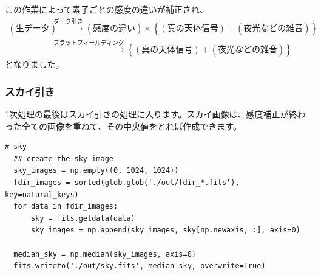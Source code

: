 この作業によって素子ごとの感度の違いが補正され、
\begin{align*}
  (\text{生データ}) &\xrightarrow{\text{ダーク引き}} (感度の違い)\times\left\{ (真の天体信号) + (夜光などの雑音) \right\} \\
  &\xrightarrow{\text{フラットフィールディング}} \left\{ (真の天体信号) + (夜光などの雑音) \right\}
\end{align*}
となりました。

\subsubsection{スカイ引き}
1次処理の最後はスカイ引きの処理に入ります。スカイ画像は、感度補正が終わった全ての画像を重ねて、その中央値をとれば作成できます。
\begin{lstlisting}[caption=スカイ画像の作成,label=code:sky_image]
  # sky
  ## create the sky image
  sky_images = np.empty((0, 1024, 1024))
  fdir_images = sorted(glob.glob('./out/fdir_*.fits'), key=natural_keys)
  for data in fdir_images:
      sky = fits.getdata(data)
      sky_images = np.append(sky_images, sky[np.newaxis, :], axis=0)
  
  median_sky = np.median(sky_images, axis=0)
  fits.writeto('./out/sky.fits', median_sky, overwrite=True)
\end{lstlisting}

